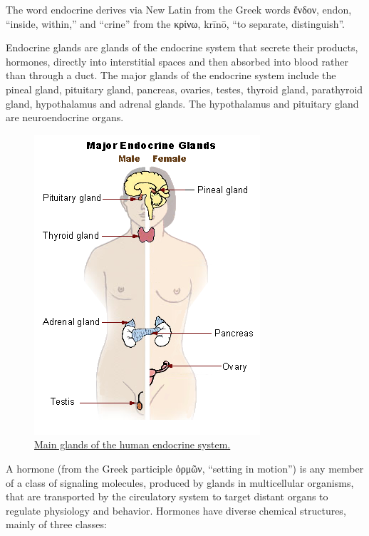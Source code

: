 The word endocrine derives via New Latin from the Greek words ἔνδον, endon, ``inside, within,'' and ``crine'' from the κρίνω, krīnō, ``to separate, distinguish''.

Endocrine glands are glands of the endocrine system that secrete their products, hormones, directly into interstitial spaces and then absorbed into blood rather than through a duct. The major glands of the endocrine system include the pineal gland, pituitary gland, pancreas, ovaries, testes, thyroid gland, parathyroid gland, hypothalamus and adrenal glands. The hypothalamus and pituitary gland are neuroendocrine organs.



\begin{figure}

{\centering \includegraphics[width=0.7\linewidth]{./figures/endocrine/Illu_endocrine_system_New} 

}

\caption{\href{https://commons.wikimedia.org/wiki/File:Illu_endocrine_system_New.png}{Main glands of the human endocrine system.}}\label{fig:majorendocrineglands}
\end{figure}

A hormone (from the Greek participle ὁρμῶν, ``setting in motion'') is any member of a class of signaling molecules, produced by glands in multicellular organisms, that are transported by the circulatory system to target distant organs to regulate physiology and behavior. Hormones have diverse chemical structures, mainly of three classes:

